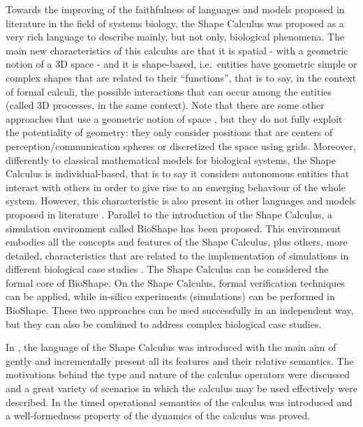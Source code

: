 \documentclass[11pt]{article}
\begin{document}
Towards the improving of the faithfulness of languages and models proposed in literature in the field of systems biology, the Shape Calculus \cite{Bartocci2009,Bartocci2010,Bartocci2010b} was proposed as a very rich language to describe mainly, but not only, biological phenomena. The main new characteristics of this calculus are that it is spatial - with a geometric notion of a 3D space - and it is shape-based, i.e.\ entities have geometric simple or complex shapes that are related to their ``functions'', that is to say, in the context of formal calculi, the possible interactions that can occur among the entities (called 3D processes, in the same context). Note that there are some other approaches that use a geometric notion of space \cite{BarbutiMMP09,John2008,sps}, but they do not fully exploit the potentiality of geometry: they only consider positions that are centers of perception/communication spheres or discretized the space using grids. Moreover, differently to classical mathematical models for biological systems, the Shape Calculus is individual-based, that is to say it considers autonomous entities that interact with others in order to give rise to an emerging behaviour of the whole system. However, this characteristic is also present in other languages and models proposed in literature \cite{Priami2004,Regev2004,Cardelli2004,Bortolussi2007,Ciocchetta2008}. Parallel to the introduction of the Shape Calculus, a simulation environment called  {\sc BioShape} \cite{bioshapeurl,iccs2010} has been proposed. This environment embodies all the concepts and features of the Shape Calculus, plus others, more detailed, characteristics that are related to the implementation of simulations in different biological case studies \cite{iccs2010,cs2bio2010,acri2010}. The Shape Calculus can be considered the formal core of {\sc BioShape}. On the Shape Calculus, formal verification techniques can be applied, while in-silico experiments (simulations) can be performed in {\sc BioShape}. These two approaches can be used successfully in an independent way, but they can also be combined to address complex biological case studies.

In \cite{Bartocci2010}, the language of the Shape Calculus was introduced with the main aim of gently and incrementally present all its features and their relative semantics. The motivations behind the type and nature of the calculus operators were discussed and a great variety of scenarios in which the calculus may be used effectively were described. In \cite{Bartocci2010b} the timed operational semantics of the calculus was introduced and a well-formedness property of the dynamics of the calculus was proved. 
\end{document}
